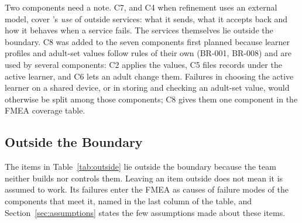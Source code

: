 \documentclass{article}
\begin{document}
Two components need a note. C7, and C4 when refinement uses an external model,
cover \progname{}'s \emph{use} of outside services: what it sends, what it
accepts back and how it behaves when a service fails. The services themselves
lie outside the boundary. C8 was added to the
seven components first planned because learner profiles and adult-set values
follow rules of their own (BR-001, BR-008) and are used by several components:
C2 applies the values, C5 files records under the active learner, and C6 lets an
adult change them. Failures in choosing the active learner on a shared device,
or in storing and checking an adult-set value, would otherwise be split among
those components; C8 gives them one component in the FMEA coverage table.

\subsection{Outside the Boundary}

The items in Table~\ref{tab:outside} lie outside the boundary because the team
neither builds nor controls them. Leaving an item outside does not mean it is
assumed to work. Its failures enter the FMEA as causes of failure modes of the
components that meet it, named in the last column of the table, and
Section~\ref{sec:assumptions} states the few assumptions made about these items.
\end{document}
